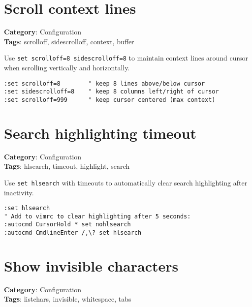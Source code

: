 \section{Scroll context lines}

\textbf{Category}: Configuration\\ \textbf{Tags}: scrolloff, sidescrolloff, context, buffer
\vspace{0.5cm}

Use {\footnotesize \Verb§set scrolloff=8 sidescrolloff=8§} to maintain context lines around cursor when scrolling vertically and horizontally.

\begin{Exa*}{}
\begin{Verbatim}[fontsize=\footnotesize, breaklines, breakanywhere]
:set scrolloff=8        " keep 8 lines above/below cursor
:set sidescrolloff=8    " keep 8 columns left/right of cursor
:set scrolloff=999      " keep cursor centered (max context)
\end{Verbatim}
\end{Exa*}

\section{Search highlighting timeout}

\textbf{Category}: Configuration\\ \textbf{Tags}: hlsearch, timeout, highlight, search
\vspace{0.5cm}

Use {\footnotesize \Verb§set hlsearch§} with timeouts to automatically clear search highlighting after inactivity.

\begin{Exa*}{}
\begin{Verbatim}[fontsize=\footnotesize, breaklines, breakanywhere]
:set hlsearch
" Add to vimrc to clear highlighting after 5 seconds:
:autocmd CursorHold * set nohlsearch
:autocmd CmdlineEnter /,\? set hlsearch
\end{Verbatim}
\end{Exa*}

\section{Show invisible characters}

\textbf{Category}: Configuration\\ \textbf{Tags}: listchars, invisible, whitespace, tabs
\vspace{0.5cm}

